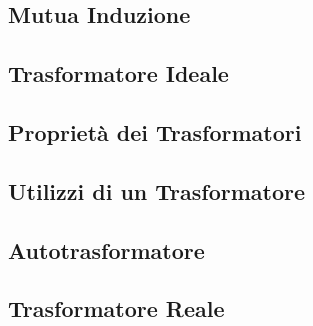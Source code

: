 \documentclass[../main.tex]{subfiles}
\begin{document}
	\subsection{Mutua Induzione}
	\subsection{Trasformatore Ideale}
	\subsection{Proprietà dei Trasformatori}
	\subsection{Utilizzi di un Trasformatore}
	\subsection{Autotrasformatore}
	\subsection{Trasformatore Reale}
\end{document}
